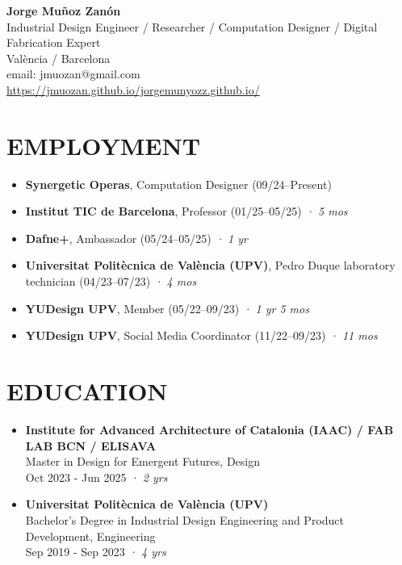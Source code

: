 \documentclass[11pt,a4paper]{article}
\begin{document}
\begin{center}
\textbf{\Large Jorge Muñoz Zanón}\\
\vspace{0.1cm}
Industrial Design Engineer / Researcher / Computation Designer / Digital Fabrication Expert\\
València / Barcelona\\
email: jmuozan@gmail.com\\
\url{https://jmuozan.github.io/jorgemunyozz.github.io/}
\end{center}

\section*{EMPLOYMENT}
\begin{itemize}[leftmargin=*,label={},itemsep=6pt]
    \item \textbf{Synergetic Operas}, Computation Designer (09/24--Present) %
    \item \textbf{Institut TIC de Barcelona}, Professor (01/25--05/25) \textit{· 5 mos} 
    \item \textbf{Dafne+}, Ambassador (05/24--05/25) \textit{· 1 yr}
    \item \textbf{Universitat Politècnica de València (UPV)}, Pedro Duque laboratory technician (04/23--07/23) \textit{· 4 mos}
    \item \textbf{YUDesign UPV}, Member (05/22--09/23) \textit{· 1 yr 5 mos}
    \item \textbf{YUDesign UPV}, Social Media Coordinator (11/22--09/23) \textit{· 11 mos}
\end{itemize}

\section*{EDUCATION}
\begin{itemize}[leftmargin=*,label={},itemsep=6pt]
    \item \textbf{Institute for Advanced Architecture of Catalonia (IAAC) / FAB LAB BCN / ELISAVA}\\
    Master in Design for Emergent Futures, Design\\
    Oct 2023 - Jun 2025 \textit{· 2 yrs}
    
    \item \textbf{Universitat Politècnica de València (UPV)}\\
    Bachelor's Degree in Industrial Design Engineering and Product Development, Engineering\\
    Sep 2019 - Sep 2023 \textit{· 4 yrs}
\end{itemize}
\end{document}
